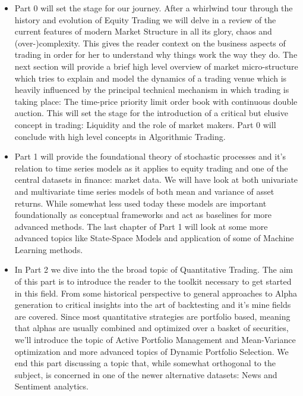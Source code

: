 \begin{itemize}
\item Part 0 will set the stage for our journey. After a whirlwind tour through the history and evolution of Equity Trading we will delve in a review of the current features of modern Market Structure in all its glory, chaos and (over-)complexity. This gives the reader context on the business aspects of trading in order for her to understand why things work the way they do. The next section will provide a brief high level overview of market micro-structure which tries to explain and model the dynamics of a trading venue which is heavily influenced by the principal technical mechanism in which trading is taking place: The time-price priority limit order book with  continuous double auction. This will set the stage for the introduction of a critical but elusive concept in trading: Liquidity and the role of market makers. Part 0 will conclude with high level concepts in Algorithmic Trading.

\item Part 1  will provide the foundational theory of stochastic processes and it's relation to time series models as it applies to equity trading and one of the central datasets in finance: market data. We will have look at both univariate and multivariate time series models of both mean and variance of asset returns. While somewhat less used today these models are important foundationally as conceptual frameworks and act as baselines for more advanced methods. The last chapter of Part 1 will look at some more advanced topics like State-Space Models and application of some of Machine Learning methods.

\item In Part 2  we dive into the the broad topic of Quantitative Trading. The aim of this part is to introduce the reader to the toolkit necessary to get started in this field. From some historical perspective to general approaches to Alpha generation to critical insights into the art of backtesting and it's mine fields are covered. Since most quantitative strategies are portfolio based, meaning that alphas are usually  combined  and optimized over a basket of securities, we'll introduce the topic of Active Portfolio Management and Mean-Variance optimization and more advanced topics of Dynamic Portfolio Selection. We end this part discussing a topic that, while somewhat orthogonal to the subject, is concerned in one of the newer alternative datasets: News and Sentiment analytics.


\end{itemize}
